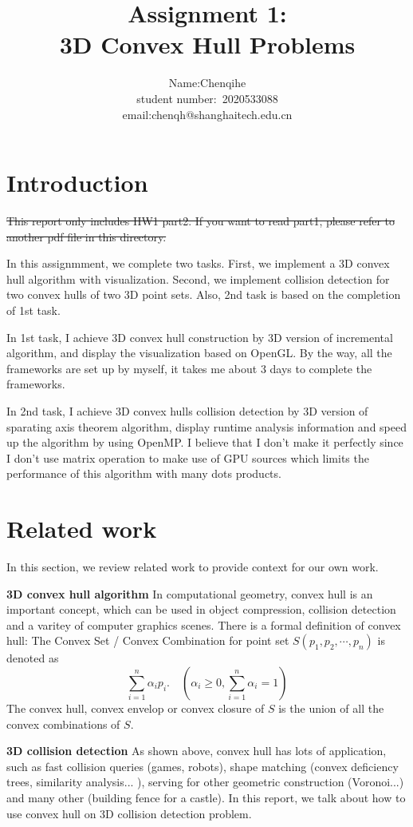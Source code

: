 \documentclass[acmtog]{acmart}
\title{Assignment 1:\\ {3D Convex Hull Problems}}
\author{Name:\quad Chenqihe  \\ student number:\ 2020533088
\\email:\quad chenqh@shanghaitech.edu.cn}
\begin{document}
\maketitle

\vspace*{2 ex}

\section{Introduction}
	\quad \st{This report only includes HW1 part2. If you want to read part1, please refer to another pdf file in this directory.}
	
	\quad In this assignmment, we complete two tasks. First, we implement a 3D convex hull algorithm with visualization. Second, we implement collision detection for two convex hulls of two 3D point sets. Also, 2nd task is based on the completion of 1st task.
	
	\quad In 1st task, I achieve 3D convex hull construction by 3D version of incremental algorithm, and display the visualization based on OpenGL. By the way, all the frameworks are set up by myself, it takes me about 3 days to complete the frameworks.
	
	\quad In 2nd task, I achieve 3D convex hulls collision detection by 3D version of sparating axis theorem algorithm,  display runtime analysis information and speed up the algorithm by using OpenMP. I believe that I don't make it perfectly since I don't use matrix operation to make use of GPU sources which limits the performance of this algorithm with many dots products.
	
\section{Related work}
In this section, we review related work to provide context for our own work.

\textbf{3D convex hull algorithm} In computational geometry, convex hull is an important concept, which can be used in object compression, collision detection and a varitey of computer graphics scenes. There is a formal definition of convex hull: The Convex Set / Convex Combination for point set $S(p_1, p_2,\cdots, p_n)$ is denoted as 
\[
\sum_{i=1}^n\alpha_ip_i. \quad(\alpha_i\ge 0, \sum_{i=1}^n\alpha_i=1)
\]
\quad The convex hull, convex envelop or convex closure of $S$ is the union of all the convex combinations of $S$.

\textbf{3D collision detection} As shown above, convex hull has lots of application, such as fast collision queries (games, robots), shape matching (convex deficiency trees, similarity analysis... ), serving for other geometric construction (Voronoi...) and many other (building fence for a castle). In this report, we talk about how to use convex hull on 3D collision detection problem.
\end{document}
